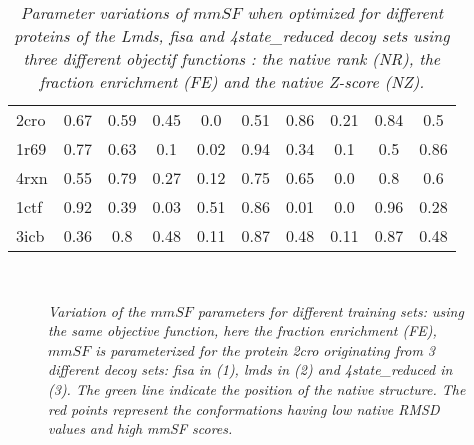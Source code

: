 \documentclass[a4paper,20pt,notitlepage,openbib]{article}
\begin{document}
\begin{table}[htbp]
\begin{center}
\begin{tabular}{| l | c c c | c c c | c c c |}
\hline
  2cro &   0.67 &   0.59 &   0.45 &   0.0 &   0.51 &   0.86 &   0.21 &   0.84 &   0.5 \\
  1r69 &   0.77 &   0.63 &   0.1 &   0.02 &   0.94 &   0.34 &   0.1 &   0.5 &   0.86 \\
  4rxn &   0.55 &   0.79 &   0.27 &   0.12 &   0.75 &   0.65 &   0.0 &   0.8 &   0.6 \\
  1ctf &   0.92 &   0.39 &   0.03 &   0.51 &   0.86 &   0.01 &   0.0 &   0.96 &   0.28 \\
  3icb &   0.36 &   0.8 &   0.48 &   0.11 &   0.87 &   0.48 &   0.11 &   0.87 &   0.48 \\
\hline
\end{tabular}
\end{center}
\caption{\label{tab_coeff_mmSF_2} \textit{
Parameter variations of $mmSF$ when optimized for different proteins of the Lmds, fisa and 4state\_reduced decoy sets using three different objectif functions : the native rank (NR), the fraction enrichment (FE) and the native Z-score (NZ).}}
\end{table}


\begin{figure}
\renewcommand{\thesubfigure}{(\arabic{subfigure})}
\centering
\mbox{\quad
      }
\mbox{}
\caption{\label{fig_training_set_2cro}\small\textit{Variation of the $mmSF$ parameters for different training sets: using the same objective function, here the fraction enrichment (FE), $mmSF$ is parameterized for the protein 2cro originating from 3 different decoy sets: fisa in (1), lmds in (2) and 4state\_reduced in (3). The green line indicate the position of the native structure. The red points represent the conformations having low native RMSD values and high mmSF scores.}}
\end{figure}
\end{document}
